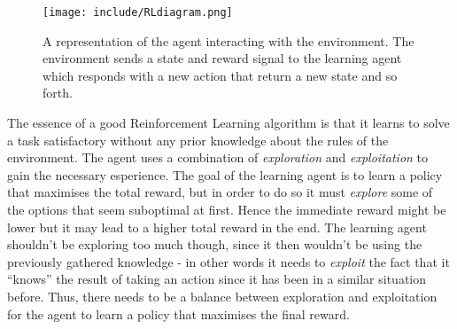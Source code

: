 \documentclass[11pt]{article}
\begin{document}
\begin{figure}[!h]
    \centering
    \texttt{[image: include/RLdiagram.png]}
    \caption{A representation of the agent interacting with the environment.
        The environment sends a state and reward signal to the
    learning agent which responds with a new action that return a new state and so forth.}
    \label{fig:agent_environment}
\end{figure}

\newpage

The essence of a good Reinforcement Learning algorithm is that it learns 
to solve a task satisfactory without any prior knowledge about the rules of the environment.
The agent uses a combination of \textit{exploration} and \textit{exploitation}
to gain the necessary esperience.
The goal of the learning agent is to learn a policy that maximises the total reward, but in order to do
so it must \textit{explore} some of the options that seem suboptimal at first.
Hence the immediate reward might be lower but it may lead to a higher total reward in the end.
The learning agent shouldn't be exploring too much though, since it then wouldn't
be using the previously gathered knowledge - in other words it needs to
\textit{exploit} the fact that it “knows” the result of taking an action since it has been in
a similar situation before.
Thus, there needs to be a balance between exploration and exploitation for the
agent to learn a policy that maximises the final reward.
\end{document}
